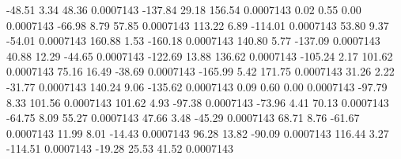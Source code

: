      -48.51        3.34       48.36     0.0007143
     -137.84       29.18      156.54     0.0007143
        0.02        0.55        0.00     0.0007143
      -66.98        8.79       57.85     0.0007143
      113.22        6.89     -114.01     0.0007143
       53.80        9.37      -54.01     0.0007143
      160.88        1.53     -160.18     0.0007143
      140.80        5.77     -137.09     0.0007143
       40.88       12.29      -44.65     0.0007143
     -122.69       13.88      136.62     0.0007143
     -105.24        2.17      101.62     0.0007143
       75.16       16.49      -38.69     0.0007143
     -165.99        5.42      171.75     0.0007143
       31.26        2.22      -31.77     0.0007143
      140.24        9.06     -135.62     0.0007143
        0.09        0.60        0.00     0.0007143
      -97.79        8.33      101.56     0.0007143
      101.62        4.93      -97.38     0.0007143
      -73.96        4.41       70.13     0.0007143
      -64.75        8.09       55.27     0.0007143
       47.66        3.48      -45.29     0.0007143
       68.71        8.76      -61.67     0.0007143
       11.99        8.01      -14.43     0.0007143
       96.28       13.82      -90.09     0.0007143
      116.44        3.27     -114.51     0.0007143
      -19.28       25.53       41.52     0.0007143
